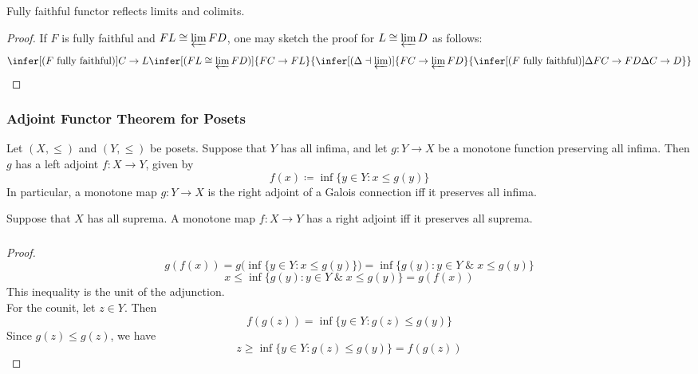 \documentclass[UTF8,11pt,colorlinks,compress,openany]{beamer}%
\begin{document}
\begin{frame}\frametitle{}
\begin{theorem}
Fully faithful functor reflects limits and colimits.
\end{theorem}
\begin{proof}
If $F$ is fully faithful and $FL\cong\varprojlim FD$, one may sketch the proof for $L\cong\varprojlim D$ as follows:
\[
\infer[(F \mbox{ fully faithful})]{C\to L}{\infer[(FL\cong \varprojlim FD)]{FC\to FL}{\infer[(\Delta\dashv \varprojlim)]{FC\to \varprojlim FD}{\infer[(F \mbox{ fully faithful})]{\Delta FC\to FD}{\Delta C\to D}}}}
\]
\end{proof}
\end{frame}

\begin{frame}\frametitle{Adjoint Functor Theorem for Posets}
\begin{theorem}
Let $(X,\leq)$ and $(Y,\leq)$ be posets. Suppose that $Y$ has all infima, and let $g:Y\to X$ be a monotone function preserving all infima. Then $g$ has a left adjoint $f:X\to Y$, given by 
\[
 f(x)\coloneqq\inf\big\{y\in Y: x\leq g(y)\big\}
\]
In particular, a monotone map $g:Y\to X$ is the right adjoint of a Galois connection iff it preserves all infima.
\end{theorem}
\begin{corollary}
 Suppose that $X$ has all suprema.
 A monotone map $f:X\to Y$ has a right adjoint iff it preserves all suprema.
\end{corollary}
\end{frame}

\begin{frame}\frametitle{}
\begin{proof}
\[g(f(x)) = g\big(\inf\big\{y\in Y: x\leq g(y)\big\}\big) = \inf\big\{g(y): y\in Y \;\&\; x\leq g(y)\big\}\]
\[x \leq \inf\big\{g(y): y\in Y \;\&\; x\leq g(y)\big\}= g(f(x))\]
This inequality is the unit of the adjunction.\\
For the counit, let $z\in Y$. Then
\[f(g(z)) = \inf\big\{y\in Y: g(z)\leq g(y)\big\}\]
Since $g(z)\leq g(z)$, we have
\[z \geq \inf\big\{y\in Y: g(z)\leq g(y)\big\} = f(g(z))\]
\end{proof}
\end{frame}
\end{document}
